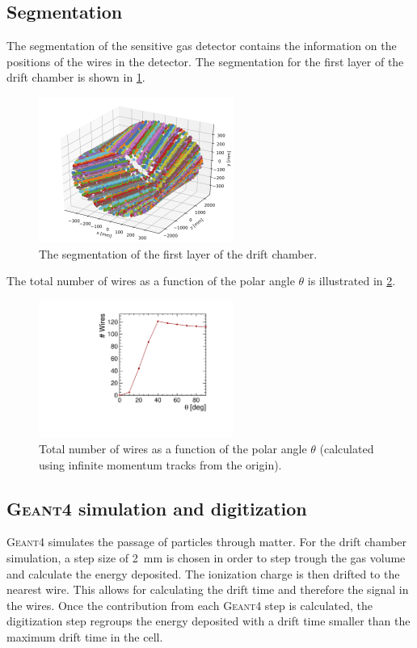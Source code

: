 \documentclass[conference]{IEEEtran}
\begin{document}
\subsection{Segmentation}

The segmentation of the sensitive gas detector contains the information on the positions of the wires in the detector. The segmentation for the first layer of the drift chamber is shown in \cref{fig_segmentation_first_case}.

\begin{figure}[!t]
	\centering
	\includegraphics[width=2.5in]{figures/allHits}
	\caption{The segmentation of the first layer of the drift chamber.}
	\label{fig_segmentation_first_case}
\end{figure}

The total number of wires as a function of the polar angle $\theta$ is illustrated in \cref{fig_segmentation_second_case}.

\begin{figure}[!t]
	\centering
	\includegraphics[width=2.5in]{Poster/Figures/numWires}%
	\caption{Total number of wires as a function of the polar angle $\theta$ (calculated using infinite momentum tracks from the origin).}
	\label{fig_segmentation_second_case}
\end{figure}


\subsection{\textsc{Geant4} simulation and digitization}
\textsc{Geant4} simulates the passage of particles through matter. For the drift chamber simulation, a step size of 2~mm is chosen in order to step trough the gas volume and calculate the energy deposited. The ionization charge is then drifted to the nearest wire. This allows for calculating the drift time and therefore the signal in the wires. Once the contribution from each \textsc{Geant4} step is calculated, the digitization step regroups the energy deposited with a drift time smaller than the maximum drift time in the cell.
\end{document}
